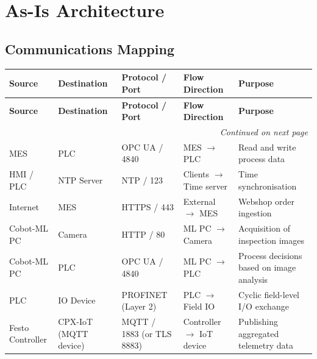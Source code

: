 \section{As-Is Architecture}
\label{sec:asis}

\subsection{Communications Mapping}

{\scriptsize
\setlength{\tabcolsep}{4pt}
\renewcommand{\arraystretch}{1.15}

\begin{longtable}{p{2.2cm} p{2.2cm} p{2.6cm} p{3.2cm} p{4.2cm}}

\toprule
\textbf{Source} & \textbf{Destination} & \textbf{Protocol / Port} & \textbf{Flow Direction} & \textbf{Purpose} \\
\midrule
\endfirsthead

\toprule
\textbf{Source} & \textbf{Destination} & \textbf{Protocol / Port} & \textbf{Flow Direction} & \textbf{Purpose} \\
\midrule
\endhead

\midrule
\multicolumn{5}{r}{\emph{Continued on next page}} \\
\midrule
\endfoot

\bottomrule
\endlastfoot

MES & PLC &
OPC UA / 4840 &
MES $\rightarrow$ PLC &
Read and write process data \\

HMI / PLC & NTP Server &
NTP / 123 &
Clients $\rightarrow$ Time server &
Time synchronisation \\

Internet & MES &
HTTPS / 443 &
External $\rightarrow$ MES &
Webshop order ingestion \\

Cobot-ML PC & Camera &
HTTP / 80 &
ML PC $\rightarrow$ Camera &
Acquisition of inspection images \\

Cobot-ML PC & PLC &
OPC UA / 4840 &
ML PC $\rightarrow$ PLC &
Process decisions based on image analysis \\

PLC & IO Device &
PROFINET (Layer 2) &
PLC $\rightarrow$ Field IO &
Cyclic field-level I/O exchange \\

Festo Controller & CPX-IoT (MQTT device) &
MQTT / 1883 (or TLS 8883) &
Controller $\rightarrow$ IoT device &
Publishing aggregated telemetry data \\


\end{longtable}}
